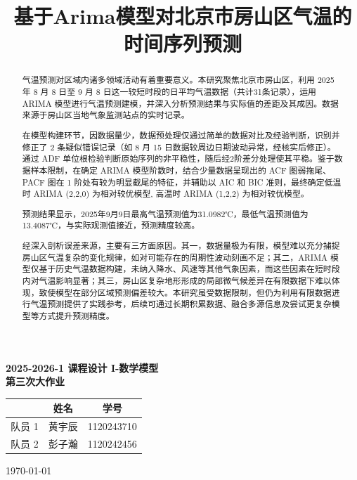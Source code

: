 \documentclass[withoutpreface,bwprint]{cumcmthesis} %
\title{基于Arima模型对北京市房山区气温的时间序列预测}
\begin{document}
\begin{titlepage}
    \centering
    \vspace*{2cm}
    \textbf{\Large 2025-2026-1 课程设计 I-数学模型} \\
    \vspace{1cm}
    \textbf{\Large 第三次大作业} \\
    \vspace{2cm}
    
    \begin{tabular}{lcc}
        \toprule
        & 姓名 & 学号 \\
        \midrule
        队员 1 & 黄宇辰 & 1120243710 \\
        队员 2 & 彭子瀚 & 1120242456 \\
        \bottomrule
    \end{tabular}
    
    \vspace{3cm}
    \today
\end{titlepage}
 \maketitle
 \begin{abstract}
    气温预测对区域内诸多领域活动有着重要意义。本研究聚焦北京市房山区，利用 2025 年 8 月 8 日至 9 月 8 日这一较短时段的日平均气温数据（共计31条记录），运用 ARIMA 模型进行气温预测建模，并深入分析预测结果与实际值的差距及其成因。数据来源于房山区当地气象监测站点的实时记录。​

    在模型构建环节，因数据量少，数据预处理仅通过简单的数据对比及经验判断，识别并修正了 2 条疑似错误记录（如 8 月 15 日数据较周边日期波动异常，经核实后修正）。通过 ADF 单位根检验判断原始序列的非平稳性，随后经2阶差分处理使其平稳。鉴于数据样本限制，在确定 ARIMA 模型阶数时，结合少量数据呈现出的 ACF 图弱拖尾、PACF 图在 1 阶处有较为明显截尾的特征，并辅助以 AIC 和 BIC 准则，最终确定低温时 ARIMA (2,2,0) 为相对较优模型, 高温时 ARIMA (1,2,2) 为相对较优模型。

    预测结果显示，2025年9月9日最高气温预测值为31.0982℃，最低气温预测值为13.4087℃，与实际观测值接近，预测精度较高。
    
    经深入剖析误差来源，主要有三方面原因。其一，数据量极为有限，模型难以充分捕捉房山区气温复杂的变化规律，如对可能存在的周期性波动刻画不足；其二，ARIMA 模型仅基于历史气温数据构建，未纳入降水、风速等其他气象因素，而这些因素在短时段内对气温影响显著；其三，房山区复杂地形形成的局部微气候差异在有限数据下难以体现，致使模型在部分区域预测偏差较大。本研究虽受数据限制，但仍为利用有限数据进行气温预测提供了实践参考，后续可通过长期积累数据、融合多源信息及尝试更复杂模型等方式提升预测精度。

\end{abstract}
\end{document}
